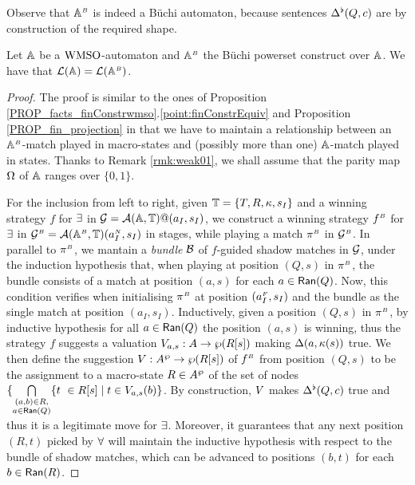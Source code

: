 Observe that $\mathbb{A}^{{\scriptscriptstyle B}}$ is indeed a B\"{u}chi automaton, because sentences $\Delta^{\flat}(Q,c)$ are by construction of the required shape.

\begin{proposition}
\label{p:4:2}
\label{PROP_Weak parity automata in buchinondet}
Let $\mathbb{A}$ be a $\mathrm{WMSO}$-automaton and $\mathbb{A}^{{\scriptscriptstyle B}}$ the
B\"{u}chi powerset construct over $\mathbb{A}$.
We have that
    $   \mathcal{L}( \mathbb{A}) =\mathcal{L}(\mathbb{A}^{{\scriptscriptstyle B}})$.
\end{proposition}
\begin{proof} The proof is similar to the ones of Proposition \ref{PROP_facts_finConstrwmso}.\ref{point:finConstrEquiv} and Proposition \ref{PROP_fin_projection} in that we have to maintain a relationship between an $\mathbb{A}^{{\scriptscriptstyle B}}$-match played in macro-states and (possibly more than one) $\mathbb{A}$-match played in states. Thanks to Remark \ref{rmk:weak01}, we shall assume that the parity map $\Omega$ of $\mathbb{A}$ ranges over $\{0,1\}$. 

For the inclusion from left to right, given $\mathbb{T} = \{ T,R,\kappa,s_I\}$ and a winning strategy $f$ for $\exists$ in $\mathcal{G} = \mathcal{A}(\mathbb{A},\mathbb{T})@(a_I,s_I)$, we construct a winning strategy $f^{{\scriptscriptstyle B}}$ for $\exists$ in $\mathcal{G}^{{\scriptscriptstyle B}} = \mathcal{A}(\mathbb{A}^{{\scriptscriptstyle B}},\mathbb{T})(a_I^{{\scriptscriptstyle N}},s_I)$ in stages, while playing a match $\pi^{{\scriptscriptstyle B}}$ in $\mathcal{G}^{{\scriptscriptstyle B}}$. In parallel to $\pi^{{\scriptscriptstyle B}}$, we mantain a \emph{bundle} $\mathcal{B}$ of $f$-guided shadow matches in $\mathcal{G}$, under the induction hypothesis that, when playing at position $(Q,s)$ in $\pi^{{\scriptscriptstyle B}}$, the bundle consists of a match at position $(a,s)$ for each $a \in \mathsf{Ran}(Q)$. Now, this condition verifies when initialising $\pi^{{\scriptscriptstyle B}}$ at position $(a_I^{{\scriptscriptstyle F}},s_I)$ and the bundle as the single match at position $(a_I,s_I)$. Inductively, given a position $(Q,s)$ in $\pi^{{\scriptscriptstyle B}}$, by inductive hypothesis for all $a \in \mathsf{Ran}(Q)$ the position $(a,s)$ is winning, thus the strategy $f$ suggests a valuation $V_{a,s}: A \rightarrow \wp (R[s])$ making $\Delta(a,\kappa(s))$ true. We then define the suggestion $V: A^{\wp} \rightarrow \wp (R[s])$ of $f^{{\scriptscriptstyle B}}$ from position $(Q,s)$ to be the assignment to a macro-state $R \in A^{\wp}$ of the set of nodes $\{\bigcap\limits_{\substack{(a,b) \in R,\\ a \in \mathsf{Ran}(Q)}}\{t\ \in R[s] \mid t \in V_{a,s}(b)\}$. By construction, $V$ makes $\Delta^{\flat}(Q,c)$ true and thus it is a legitimate move for $\exists$. Moreover, it guarantees that any next position $(R,t)$ picked by $\forall$ will maintain the inductive hypothesis with respect to the bundle of shadow matches, which can be advanced to positions $(b,t)$ for each $b \in \mathsf{Ran}(R)$.


\end{proof}
